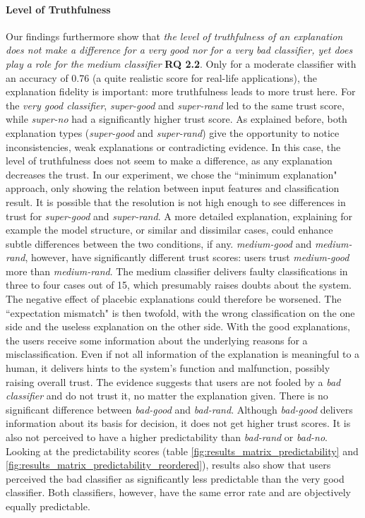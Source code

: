 \paragraph{Level of Truthfulness} 
Our findings furthermore show that \textit{the level of truthfulness of an explanation does not make a difference for a very good nor for a very bad classifier, yet does play a role for the medium classifier} \textbf{RQ 2.2}. Only for a moderate classifier with an accuracy of 0.76 (a quite realistic score for real-life applications), the explanation fidelity is important: more truthfulness leads to more trust here.\newline
For the \textit{very good classifier}, \textit{super-good} and \textit{super-rand} led to the same trust score, while \textit{super-no} had a significantly higher trust score. As explained before, both explanation types (\textit{super-good} and \textit{super-rand}) give the opportunity to notice inconsistencies, weak explanations or contradicting evidence. In this case, the level of truthfulness does not seem to make a difference, as any explanation decreases the trust. In our experiment, we chose the ``minimum explanation" approach, only showing the relation between input features and classification result. It is possible that the resolution is not high enough to see differences in trust for \textit{super-good} and \textit{super-rand}. A more detailed explanation, explaining for example the model structure, or similar and dissimilar cases, could enhance subtle differences between the two conditions, if any.\newline
\textit{medium-good} and \textit{medium-rand}, however, have significantly different trust scores: users trust \textit{medium-good} more than \textit{medium-rand}. The medium classifier delivers faulty classifications in three to four cases out of 15, which presumably raises doubts about the system. The negative effect of placebic explanations could therefore be worsened. The ``expectation mismatch" is then twofold, with the wrong classification on the one side and the useless explanation on the other side. With the good explanations, the users receive some information about the underlying reasons for a misclassification. Even if not all information of the explanation is meaningful to a human, it delivers hints to the system's function and malfunction, possibly raising overall trust.\newline
The evidence suggests that users are not fooled by a \textit{bad classifier} and do not trust it, no matter the explanation given. There is no significant difference between \textit{bad-good} and \textit{bad-rand}. Although \textit{bad-good} delivers information about its basis for decision, it does not get higher trust scores. It is also not perceived to have a higher predictability than \textit{bad-rand} or \textit{bad-no}. Looking at the predictability scores (table \ref{fig:results_matrix_predictability} and \ref{fig:results_matrix_predictability_reordered}), results also show that users perceived the bad classifier as significantly less predictable than the very good classifier. Both classifiers, however, have the same error rate and are objectively equally predictable.\newline

